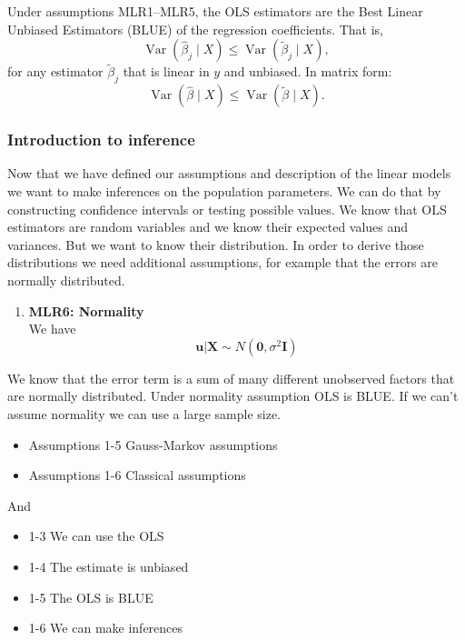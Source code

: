 \begin{theorem}
Under assumptions MLR1--MLR5, the OLS estimators are the Best Linear Unbiased 
Estimators (BLUE) of the regression coefficients. That is,
\[
    \operatorname{Var}(\hat{\beta}_j \mid X)
    \le
    \operatorname{Var}(\tilde{\beta}_j \mid X),
\]
for any estimator $\tilde{\beta}_j$ that is linear in $y$ and unbiased.  
In matrix form:
\[
    \operatorname{Var}(\hat{\beta} \mid X)
    \le
    \operatorname{Var}(\tilde{\beta} \mid X).
\]
\end{theorem}

\vspace{10pt}

\subsubsection{Introduction to inference}

Now that we have defined our assumptions and description of the linear models we want to make inferences on the population parameters. 
We can do that by constructing confidence intervals or testing possible values. We know that OLS estimators are random variables and we know their expected values and variances. But 
we want to know their distribution. In order to derive those distributions we need additional assumptions, for example that the errors are normally distributed.

\begin{enumerate}[resume]
    \item \textbf{MLR6: Normality} \\
    We have
    \[
    \textbf{u} | \textbf{X} \sim N(\textbf{0}, \sigma^2 \textbf{I})
    \]
\end{enumerate}

We know that the error term is a sum of many different unobserved factors that are normally distributed. Under normality assumption OLS is BLUE. If we can't assume normality we can use a large sample size.

\begin{itemize}
    \item Assumptions 1-5 \ra Gauss-Markov assumptions
    \item Assumptions 1-6 \ra Classical assumptions
\end{itemize}


And 

\begin{itemize}
    \item 1-3 \ra We can use the OLS
    \item 1-4 \ra The estimate is unbiased
    \item 1-5 \ra The OLS is BLUE
    \item 1-6 \ra We can make inferences
\end{itemize}

